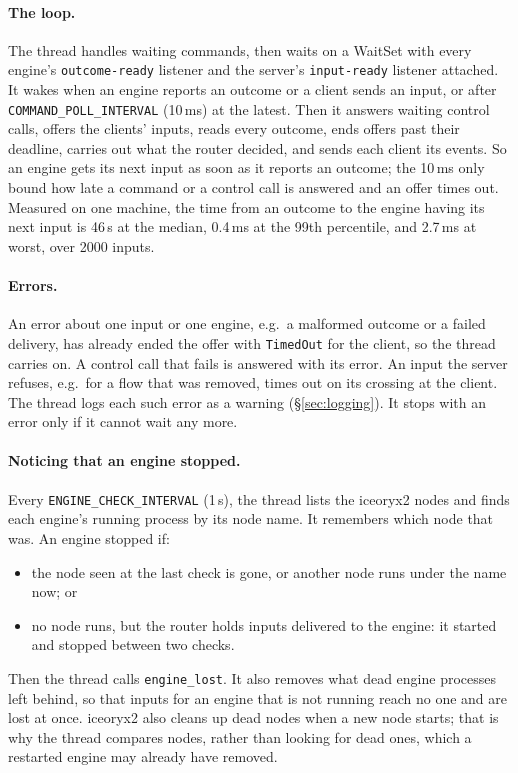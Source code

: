 \documentclass[11pt]{article}
\newcommand{\code}[1]{\texttt{#1}}
\begin{document}
\paragraph{The loop.} The thread handles waiting commands, then waits on a
WaitSet with every engine's \code{outcome-ready} listener and the server's
\code{input-ready} listener attached. It wakes when an engine reports an
outcome or a client sends an input, or after \code{COMMAND\_POLL\_INTERVAL}
(10\,ms) at the latest. Then it answers waiting control calls, offers the
clients' inputs, reads every outcome, ends offers past their deadline, carries
out what the router decided, and sends each client its events. So an engine
gets its next input as soon as it reports an outcome; the 10\,ms only bound
how late a command or a control call is answered and an offer times out.
Measured on one machine, the time from an outcome to the engine having its
next input is 46\,\textmu s at the median, 0.4\,ms at the 99th percentile, and
2.7\,ms at worst, over 2000 inputs.

\paragraph{Errors.} An error about one input or one engine, e.g.\ a malformed
outcome or a failed delivery, has already ended the offer with
\code{TimedOut} for the client, so the thread carries on. A control call that
fails is answered with its error. An input the server refuses, e.g.\ for a flow
that was removed, times out on its crossing at the client. The thread logs
each such error as a warning (\S\ref{sec:logging}). It stops with an error
only if it cannot wait any more.

\paragraph{Noticing that an engine stopped.} Every
\code{ENGINE\_CHECK\_INTERVAL} (1\,s), the thread lists the iceoryx2 nodes
and finds each engine's running process by its node name. It remembers which
node that was. An engine stopped if:
\begin{itemize}[nosep]
  \item the node seen at the last check is gone, or another node runs under
        the name now; or
  \item no node runs, but the router holds inputs delivered to the engine: it
        started and stopped between two checks.
\end{itemize}
Then the thread calls \code{engine\_lost}. It also removes what dead engine
processes left behind, so that inputs for an engine that is not running
reach no one and are lost at once. iceoryx2 also cleans up dead nodes when a
new node starts; that is why the thread compares nodes, rather than looking
for dead ones, which a restarted engine may already have removed.
\end{document}
